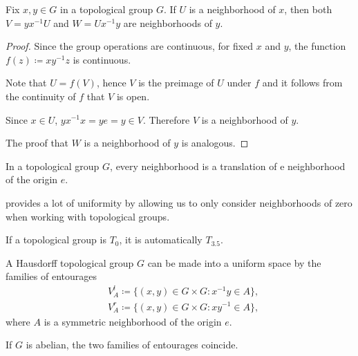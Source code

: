 \begin{proposition}\label{thm:neighborhood_translations_in_topological_groups}
  Fix \( x, y \in G \) in a topological group \( G \). If \( U \) is a neighborhood of \( x \), then both \( V = yx^{-1} U \) and \( W = U x^{-1}y \) are neighborhoods of \( y \).
\end{proposition}
\begin{proof}
  Since the group operations are continuous, for fixed \( x \) and \( y \), the function \( f(z) \coloneqq xy^{-1}z \) is continuous.

  Note that \( U = f(V) \), hence \( V \) is the preimage of \( U \) under \( f \) and it follows from the continuity of \( f \) that \( V \) is open.

  Since \( x \in U \), \( yx^{-1}x = ye = y \in V \). Therefore \( V \) is a neighborhood of \( y \).

  The proof that \( W \) is a neighborhood of \( y \) is analogous.
\end{proof}

\begin{corollary}\label{thm:origin_neighborhoods_in_topological_groups}
  In a topological group \( G \), every neighborhood is a translation of e neighborhood of the origin \( e \).
\end{corollary}

\begin{remark}\label{remark:origin_neighborhoods_in_topological_groups}
   provides a lot of uniformity by allowing us to only consider neighborhoods of zero when working with topological groups.
\end{remark}

\begin{proposition}\label{thm:topological_group_t0_iff_t3.5}
  If a topological group is \( T_0 \), it is automatically \( T_{3.5} \).
\end{proposition}

\begin{proposition}\label{thm:topological_group_uniform_space}
  A Hausdorff topological group \( G \) can be made into a uniform space by the families of entourages
  \begin{align*}
    &V^l_A \coloneqq \{ (x, y) \in G \times G \colon x^{-1} y \in A \}, \\
    &V^r_A \coloneqq \{ (x, y) \in G \times G \colon x y^{-1} \in A \},
  \end{align*}
  where \( A \) is a symmetric neighborhood of the origin \( e \).

  If \( G \) is abelian, the two families of entourages coincide.
\end{proposition}

